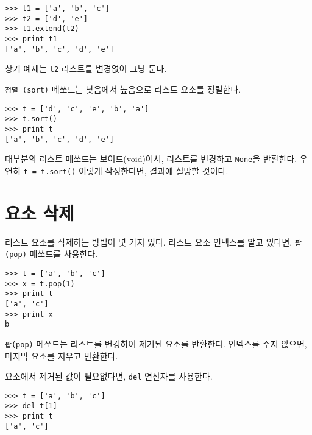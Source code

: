 \beforeverb
\begin{verbatim}
>>> t1 = ['a', 'b', 'c']
>>> t2 = ['d', 'e']
>>> t1.extend(t2)
>>> print t1
['a', 'b', 'c', 'd', 'e']
\end{verbatim}
\afterverb
%

상기 예제는 {\tt t2} 리스트를 변경없이 그냥 둔다.

{\tt 정렬 (sort)} 메쏘드는 낮음에서 높음으로 리스트 요소를 정렬한다.


\beforeverb
\begin{verbatim}
>>> t = ['d', 'c', 'e', 'b', 'a']
>>> t.sort()
>>> print t
['a', 'b', 'c', 'd', 'e']
\end{verbatim}
\afterverb
%

대부분의 리스트 메쏘드는 보이드(void)여서, 리스트를 변경하고 {\tt None}을 반환한다.
우연히 {\tt t = t.sort()} 이렇게 작성한다면, 결과에 실망할 것이다.


\section{요소 삭제}


리스트 요소를 삭제하는 방법이 몇 가지 있다. 
리스트 요소 인덱스를 알고 있다면, {\tt 팝 (pop)} 메쏘드를 사용한다.


\beforeverb
\begin{verbatim}
>>> t = ['a', 'b', 'c']
>>> x = t.pop(1)
>>> print t
['a', 'c']
>>> print x
b
\end{verbatim}
\afterverb
%

{\tt 팝(pop)} 메쏘드는 리스트를 변경하여  제거된 요소를 반환한다.
인덱스를 주지 않으면, 마지막 요소를 지우고 반환한다.

요소에서 제거된 값이 필요없다면, {\tt del} 연산자를 사용한다.


\beforeverb
\begin{verbatim}
>>> t = ['a', 'b', 'c']
>>> del t[1]
>>> print t
['a', 'c']
\end{verbatim}
\afterverb
%

